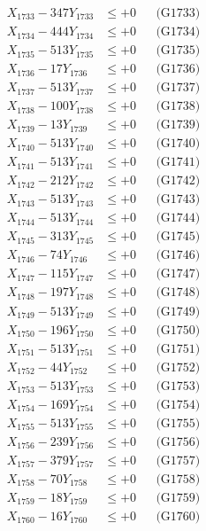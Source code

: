 \documentclass[a4paper,10pt]{article}
\begin{document}
{\begin{align}
X_{1733} - 347Y_{1733} &\leq +0 && \text{(G1733)} \\
X_{1734} - 444Y_{1734} &\leq +0 && \text{(G1734)} \\
X_{1735} - 513Y_{1735} &\leq +0 && \text{(G1735)} \\
X_{1736} - 17Y_{1736} &\leq +0 && \text{(G1736)} \\
X_{1737} - 513Y_{1737} &\leq +0 && \text{(G1737)} \\
X_{1738} - 100Y_{1738} &\leq +0 && \text{(G1738)} \\
X_{1739} - 13Y_{1739} &\leq +0 && \text{(G1739)} \\
X_{1740} - 513Y_{1740} &\leq +0 && \text{(G1740)} \\
\allowbreak
X_{1741} - 513Y_{1741} &\leq +0 && \text{(G1741)} \\
X_{1742} - 212Y_{1742} &\leq +0 && \text{(G1742)} \\
X_{1743} - 513Y_{1743} &\leq +0 && \text{(G1743)} \\
X_{1744} - 513Y_{1744} &\leq +0 && \text{(G1744)} \\
X_{1745} - 313Y_{1745} &\leq +0 && \text{(G1745)} \\
X_{1746} - 74Y_{1746} &\leq +0 && \text{(G1746)} \\
X_{1747} - 115Y_{1747} &\leq +0 && \text{(G1747)} \\
X_{1748} - 197Y_{1748} &\leq +0 && \text{(G1748)} \\
X_{1749} - 513Y_{1749} &\leq +0 && \text{(G1749)} \\
X_{1750} - 196Y_{1750} &\leq +0 && \text{(G1750)} \\
\allowbreak
X_{1751} - 513Y_{1751} &\leq +0 && \text{(G1751)} \\
X_{1752} - 44Y_{1752} &\leq +0 && \text{(G1752)} \\
X_{1753} - 513Y_{1753} &\leq +0 && \text{(G1753)} \\
X_{1754} - 169Y_{1754} &\leq +0 && \text{(G1754)} \\
X_{1755} - 513Y_{1755} &\leq +0 && \text{(G1755)} \\
X_{1756} - 239Y_{1756} &\leq +0 && \text{(G1756)} \\
X_{1757} - 379Y_{1757} &\leq +0 && \text{(G1757)} \\
X_{1758} - 70Y_{1758} &\leq +0 && \text{(G1758)} \\
X_{1759} - 18Y_{1759} &\leq +0 && \text{(G1759)} \\
X_{1760} - 16Y_{1760} &\leq +0 && \text{(G1760)} \\

\end{align}}
\end{document}
